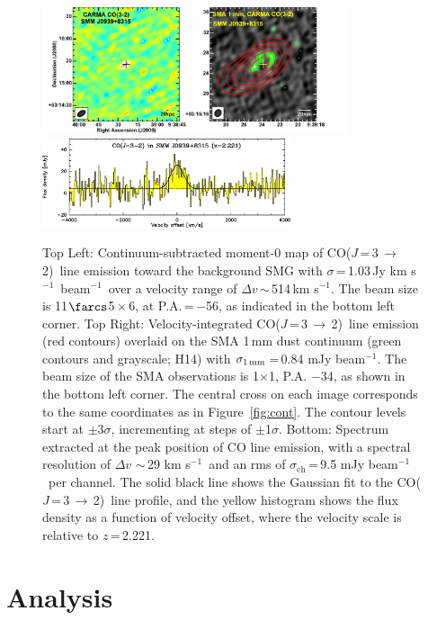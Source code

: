 \documentclass[twocolumn,apj,numberedappendix]{emulateapj}
\newcommand{\CO}{\mbox{CO($J$\,=\,3\,$\rightarrow$\,2) }}
\newcommand{\pmOne}{\mbox{$^{-1}$}}
\begin{document}
\begin{figure}[tbph] 
\centering
\includegraphics[width=0.8\textwidth]{Figure/LinePanel.pdf}
\includegraphics[width=0.65\textwidth]{Figure/smmj0939-co32_spec.eps}
\caption{Top Left: Continuum-subtracted moment-0 map of \CO line emission toward 
the background SMG with $\sigma$\,=\,1.03\,Jy\,\,km\,\,s\pmOne\ beam\pmOne\ over a velocity range of $\Delta v$\,$\sim$\,514\,km\,\,s\pmOne. The beam size is 11$\farcs$5\,$\times$\,6, at P.A.\,=\,$-$56\degr, as indicated in the bottom left corner. 
Top Right: Velocity-integrated \CO line emission (red contours) overlaid on the SMA 1\,mm dust continuum (green contours and grayscale; H14) with $\sigma_\textrm{1\,mm}$\,=\,0.84 mJy beam\pmOne. The beam size of the SMA observations is 1$ \times $1, P.A. $-$34\degr, as shown 
in the bottom left corner. 
The central cross on each image corresponds to the same coordinates as in Figure~\ref{fig:cont}. The contour levels start at $\pm$3$\sigma$, incrementing at
steps of $\pm$1$\sigma$. 
Bottom: 
Spectrum extracted at the peak position of CO line emission, with a spectral resolution of $\Delta v$ $\sim$\,29 km\,\,s\pmOne\, and an rms of $\sigma_\textrm{ch}$\,=\,9.5 mJy beam\pmOne\ per channel. The
solid black line shows the Gaussian fit to the \CO line profile, and the yellow histogram shows the 
flux density as a function of velocity offset, where the velocity scale is relative to $z$\,=\,2.221. 
\label{fig:mom0}}
\end{figure}


\section{Analysis}
\end{document}
